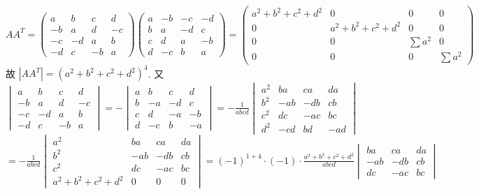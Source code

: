 	\paragraph{} %
		$AA^T = \begin{pmatrix}
				a  & b  & c  & d  \\
				-b & a  & d  & -c \\
				-c & -d & a  & b  \\
				-d & c  & -b & a
			\end{pmatrix}
			\begin{pmatrix}
				a & -b & -c & -d \\
				b & a  & -d & c  \\
				c & d  & a  & -b \\
				d & -c & b  & a
			\end{pmatrix} = \begin{pmatrix}
				a^2+b^2+c^2+d^2 & 0               & 0        & 0        \\
				0               & a^2+b^2+c^2+d^2 & 0        & 0        \\
				0               & 0               & \sum a^2 & 0        \\
				0               & 0               & 0        & \sum a^2
			\end{pmatrix}$
		故 $|AA^T| = (a^2+b^2+c^2+d^2)^4$.
		又 $\begin{vmatrix}
				a  & b  & c  & d  \\
				-b & a  & d  & -c \\
				-c & -d & a  & b  \\
				-d & c  & -b & a
			\end{vmatrix} = -\begin{vmatrix}
				a & b  & c  & d  \\
				b & -a & -d & c  \\
				c & d  & -a & -b \\
				d & -c & b  & -a
			\end{vmatrix} = -\frac{1}{abcd}\begin{vmatrix}
				a^2 & ba  & ca  & da  \\
				b^2 & -ab & -db & cb  \\
				c^2 & dc  & -ac & bc  \\
				d^2 & -cd & bd  & -ad
			\end{vmatrix}$
		$= -\frac{1}{abcd}\begin{vmatrix}
				a^2             & ba  & ca  & da \\
				b^2             & -ab & -db & cb \\
				c^2             & dc  & -ac & bc \\
				a^2+b^2+c^2+d^2 & 0   & 0   & 0
			\end{vmatrix} = (-1)^{1+4} \cdot (-1) \cdot \frac{a^2+b^2+c^2+d^2}{abcd} \begin{vmatrix}
				ba  & ca  & da \\
				-ab & -db & cb \\
				dc  & -ac & bc
			\end{vmatrix}$
